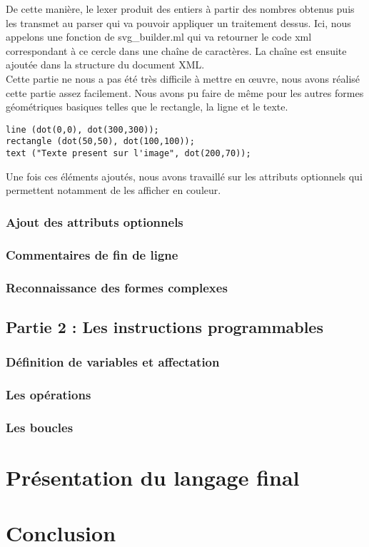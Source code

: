 		De cette manière, le lexer produit des entiers à partir des nombres obtenus puis les transmet au parser qui va pouvoir appliquer un traitement dessus. Ici, nous appelons une fonction de svg\_builder.ml qui va retourner le code xml correspondant à ce cercle dans une chaîne de caractères. La chaîne est ensuite ajoutée dans la structure du document XML.\\

		Cette partie ne nous a pas été très difficile à mettre en œuvre, nous avons réalisé cette partie assez facilement. Nous avons pu faire de même pour les autres formes géométriques basiques telles que le rectangle, la ligne et le texte.

\begin{lstlisting}[morekeywords={line, dot, rectangle, text}]
line (dot(0,0), dot(300,300));
rectangle (dot(50,50), dot(100,100)); 
text ("Texte present sur l'image", dot(200,70));
\end{lstlisting}

		Une fois ces éléments ajoutés, nous avons travaillé sur les attributs optionnels qui permettent notamment de les afficher en couleur.

		\subsection{Ajout des attributs optionnels}
	
		\subsection{Commentaires de fin de ligne}
	
		\subsection{Reconnaissance des formes complexes}
	
	\section{Partie 2 : Les instructions programmables}

		\subsection{Définition de variables et affectation}
		
		\subsection{Les opérations}

		\subsection{Les boucles}

\chapter{Présentation du langage final}

\chapter*{Conclusion}


